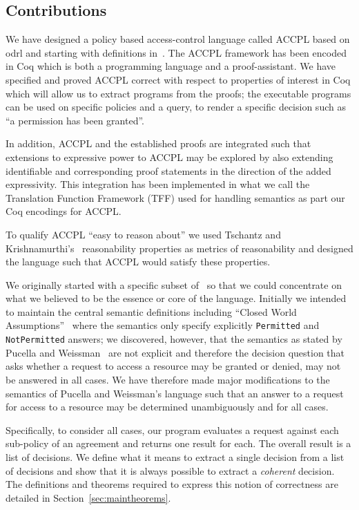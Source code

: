 \documentclass[conference]{IEEEtran}
\newcommand{\syn}{\texttt}
\begin{document}
\subsection{Contributions}\label{sec:contribs}

We have designed a policy based access-control language called \ac{ACCPL} based on \ac{odrl} and starting with definitions in~\cite{pucella2006}. The \ac{ACCPL} framework has been encoded in Coq which is both a programming language and a proof-assistant. We have specified and proved \ac{ACCPL} correct with respect to properties of interest in Coq which will allow us to extract programs from the proofs; the executable programs can be used on specific policies and a query, to render a specific decision such as ``a permission has been granted''. 

In addition, \ac{ACCPL} and the established proofs are integrated such that 
extensions to expressive power to \ac{ACCPL} may be explored by also extending identifiable and corresponding proof statements in the direction of the added expressivity. This integration has been implemented in what we call the Translation Function Framework (TFF) used for handling semantics as part our Coq encodings for \ac{ACCPL}.


To qualify \ac{ACCPL} ``easy to reason about'' we used Tschantz and Krishnamurthi's~\cite{Tschantz} reasonability properties as metrics of reasonability and designed the language such that \ac{ACCPL} would satisfy these properties.

We originally started with a specific subset of~\cite{pucella2006} so that we could concentrate on what we believed to be the essence or core of the language. Initially we intended to maintain the central semantic definitions including ``Closed World Assumptions''~\cite{pucella2006} where the semantics only specify explicitly \syn{Permitted} and \syn{NotPermitted} answers; we discovered, however, that the semantics as stated by Pucella and Weissman~\cite{pucella2006} are not explicit and therefore the decision question that asks whether a request to access a resource may be granted or denied, may not be answered in all cases. We have therefore made major modifications to the semantics of Pucella and Weissman's language such that an answer to a request for access to a resource may be determined unambiguously and for all cases.
 
%
Specifically, to consider all cases, our program evaluates a request
against each sub-policy of an agreement and returns one result for
each. The overall result is a list of decisions. We define what it
means to extract a single decision from a list of decisions and show
that it is always possible to extract a \emph{coherent} decision. The
definitions and theorems required to express this notion of
correctness are detailed in Section~\ref{sec:maintheorems}.
\end{document}
